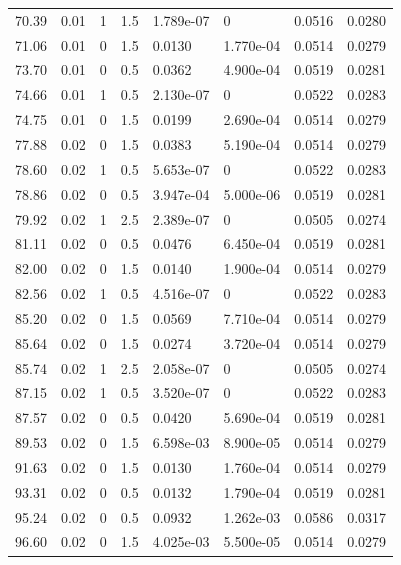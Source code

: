 \documentclass[preview]{standalone}
\begin{document}
{{{\begin{tabular}{L{1.2cm}C{1.2cm} C{0.3cm}C{0.5cm} C{1.4cm}C{1.4cm} C{1.4cm}C{1.4cm}}
  70.39  &  0.01  & 1     & 1.5 &  1.789e-07  & 0  & 0.0516 &  0.0280   \\ 
  71.06  &  0.01  & 0     & 1.5 &  0.0130  & 1.770e-04  & 0.0514 &  0.0279   \\ 
  73.70  &  0.01  & 0     & 0.5 &  0.0362  & 4.900e-04  & 0.0519 &  0.0281   \\ 
  74.66  &  0.01  & 1     & 0.5 &  2.130e-07  & 0  & 0.0522 &  0.0283   \\ 
  74.75  &  0.01  & 0     & 1.5 &  0.0199  & 2.690e-04  & 0.0514 &  0.0279   \\ 
  77.88  &  0.02  & 0     & 1.5 &  0.0383  & 5.190e-04  & 0.0514 &  0.0279   \\ 
  78.60  &  0.02  & 1     & 0.5 &  5.653e-07  & 0  & 0.0522 &  0.0283   \\ 
  78.86  &  0.02  & 0     & 0.5 &  3.947e-04  & 5.000e-06  & 0.0519 &  0.0281   \\ 
  79.92  &  0.02  & 1     & 2.5 &  2.389e-07  & 0  & 0.0505 &  0.0274   \\ 
  81.11  &  0.02  & 0     & 0.5 &  0.0476  & 6.450e-04  & 0.0519 &  0.0281   \\ 
  82.00  &  0.02  & 0     & 1.5 &  0.0140  & 1.900e-04  & 0.0514 &  0.0279   \\ 
  82.56  &  0.02  & 1     & 0.5 &  4.516e-07  & 0  & 0.0522 &  0.0283   \\ 
  85.20  &  0.02  & 0     & 1.5 &  0.0569  & 7.710e-04  & 0.0514 &  0.0279   \\ 
  85.64  &  0.02  & 0     & 1.5 &  0.0274  & 3.720e-04  & 0.0514 &  0.0279   \\ 
  85.74  &  0.02  & 1     & 2.5 &  2.058e-07  & 0  & 0.0505 &  0.0274   \\ 
  87.15  &  0.02  & 1     & 0.5 &  3.520e-07  & 0  & 0.0522 &  0.0283   \\ 
  87.57  &  0.02  & 0     & 0.5 &  0.0420  & 5.690e-04  & 0.0519 &  0.0281   \\ 
  89.53  &  0.02  & 0     & 1.5 &  6.598e-03  & 8.900e-05  & 0.0514 &  0.0279   \\ 
  91.63  &  0.02  & 0     & 1.5 &  0.0130  & 1.760e-04  & 0.0514 &  0.0279   \\ 
  93.31  &  0.02  & 0     & 0.5 &  0.0132  & 1.790e-04  & 0.0519 &  0.0281   \\ 
  95.24  &  0.02  & 0     & 0.5 &  0.0932  & 1.262e-03  & 0.0586 &  0.0317   \\ 
  96.60  &  0.02  & 0     & 1.5 &  4.025e-03  & 5.500e-05  & 0.0514 &  0.0279   \\ 

\end{tabular}}}}
\end{document}
